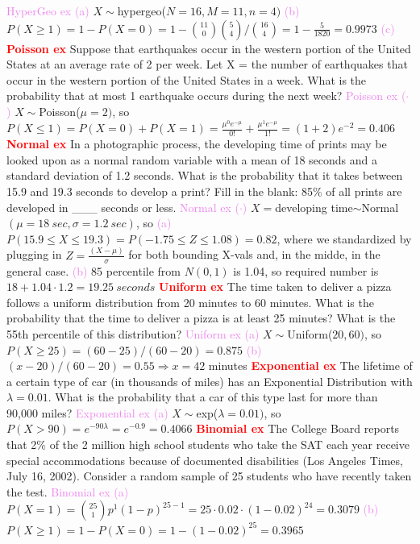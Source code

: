 \documentclass[10pt]{extarticle}
\newcommand{\dist}[3]{${#1}\mathtt{\sim}${#2}(${#3})$}
\newcommand{\re}[1]{\textcolor{red}{\textbf{#1}}}
\newcommand{\pr}[1]{\textcolor{violet}{#1}}
\begin{document}
	\pr{HyperGeo ex}
			\pr{(a)} \dist{X}{hypergeo}{N=16,M=11,n=4}
			\pr{(b)} $P(X\geq 1) = 1-P(X=0) = 1 - {11 \choose 0}{5 \choose 4}/{16 \choose 4}
			= 1 - \frac{5}{1820} = 0.9973$
			\pr{(c)}
	\re{Poisson ex} Suppose that earthquakes occur in the western portion of the United States at
		an average rate of 2 per week. Let X = {the number of earthquakes that occur in the western
		portion of the United States in a week}. What is the probability that at most 1 earthquake
		occurs during the next week?
	\pr{Poisson ex}
			\pr{($\cdot$)} \dist{X}{Poisson}{\mu=2}, so $P(X\leq 1)
			= P(X=0)+P(X=1)=\frac{\mu^{0}e^{-\mu}}{0!}+\frac{\mu^{1}e^{-\mu}}{1!}=(1+2)e^{-2}=0.406$
	\re{Normal ex} In a photographic process, the developing time of prints may be looked upon as a
		normal random variable with a mean of 18 seconds and a standard deviation of 1.2 seconds.
		What is the probability that it takes between 15.9 and 19.3 seconds to develop a print?
		Fill in the blank: 85\% of all prints are developed in \_\_\_ seconds or less. 
	\pr{Normal ex}
		\pr{($\cdot$)} $X=$developing time$\mathtt{\sim}$Normal$(\mu=18~sec, \sigma=1.2~sec)$,
		so
		\pr{(a)} $P(15.9\leq X\leq 19.3) = P(-1.75\leq Z\leq 1.08) = 0.82$, where we standardized
		by plugging in $Z=\frac{(X-\mu)}{\sigma}$ for both bounding X-vals and, in the midde, in
		the general case.
		\pr{(b)} 85 percentile from $N(0,1)$ is 1.04, so required number is
		$18+1.04\cdot 1.2=19.25~seconds$
	\re{Uniform ex} The time taken to deliver a pizza follows a uniform distribution from 20
		minutes to 60 minutes. What is the probability that the time to deliver a pizza is at least
		25 minutes? What is the 55th percentile of this distribution?
	\pr{Uniform ex}
		\pr{(a)} \dist{X}{Uniform}{20,60}, so $P(X\geq 25) = (60-25)/(60-20) = 0.875$
		\pr{(b)} $(x-20)/(60-20) = 0.55 \Rightarrow x=42$ minutes
	\re{Exponential ex} The lifetime of a certain type of car (in thousands of miles) has an
		Exponential Distribution with $\lambda = 0.01$. What is the probability that a car of this
		type last for more than 90,000 miles?
	\pr{Exponential ex}
		\pr{(a)} \dist{X}{exp}{\lambda=0.01}, so $P(X>90)=e^{-90\lambda}=e^{-0.9}=0.4066$
	\re{Binomial ex} The College Board reports that 2\% of the 2 million high school students who
		take the SAT each year receive special accommodations because of documented disabilities
		(Los Angeles Times, July 16, 2002). Consider a random sample of 25 students who have
		recently taken the test.
	\pr{Binomial ex}
		\pr{(a)} $P(X=1)={25 \choose 1}p^{1}(1-p)^{25-1}=25\cdot 0.02\cdot (1-0.02)^{24}=0.3079$
		\pr{(b)} $P(X\geq 1)=1-P(X=0)=1-(1-0.02)^{25}=0.3965$
\end{document}
